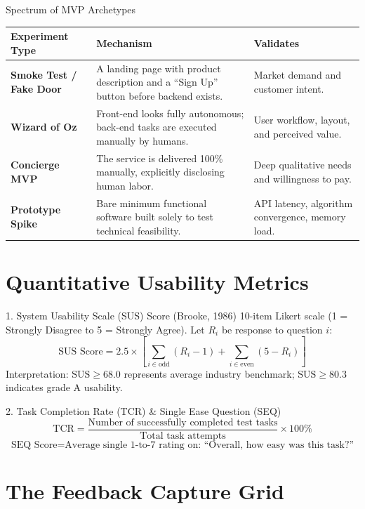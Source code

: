 \begin{frameworkbox}{Spectrum of MVP Archetypes}
\begin{tabularx}{\linewidth}{|l|X|l|} \hline
\textbf{Experiment Type} & \textbf{Mechanism} & \textbf{Validates} \\ \hline
\textbf{Smoke Test / Fake Door} & A landing page with product description and a ``Sign Up'' button before backend exists. & Market demand and customer intent. \\ \hline
\textbf{Wizard of Oz} & Front-end looks fully autonomous; back-end tasks are executed manually by humans. & User workflow, layout, and perceived value. \\ \hline
\textbf{Concierge MVP} & The service is delivered 100\% manually, explicitly disclosing human labor. & Deep qualitative needs and willingness to pay. \\ \hline
\textbf{Prototype Spike} & Bare minimum functional software built solely to test technical feasibility. & API latency, algorithm convergence, memory load. \\ \hline
\end{tabularx}
\end{frameworkbox}

\section{Quantitative Usability Metrics}

\begin{metricbox}{1. System Usability Scale (SUS) Score (Brooke, 1986)}
10-item Likert scale (1 = Strongly Disagree to 5 = Strongly Agree). Let $R_i$ be response to question $i$:
\[
\text{SUS Score} = 2.5 \times \left[ \sum_{i \in \text{odd}} (R_i - 1) + \sum_{i \in \text{even}} (5 - R_i) \right]
\]
Interpretation: $\text{SUS} \ge 68.0$ represents average industry benchmark; $\text{SUS} \ge 80.3$ indicates grade A usability.
\end{metricbox}

\begin{metricbox}{2. Task Completion Rate (TCR) \& Single Ease Question (SEQ)}
\[
\text{TCR} = \frac{\text{Number of successfully completed test tasks}}{\text{Total task attempts}} \times 100\%
\]
\[
\text{SEQ Score} = \text{Average single 1-to-7 rating on: ``Overall, how easy was this task?''}
\]
\end{metricbox}

\section{The Feedback Capture Grid}

